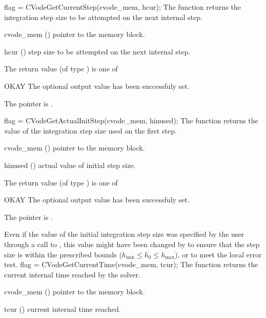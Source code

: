 {}
{
  flag = CVodeGetCurrentStep(cvode\_mem, hcur);
}
{
  The function  returns the
  integration step size to be attempted on the next internal step.
}
{
  \begin{args}
  \item[cvode\_mem] ()
    pointer to the {\cvodes} memory block.
  \item[hcur] ()
    step size to be attempted on the next internal step.
  \end{args}
}
{
  The return value  (of type ) is one of
  \begin{args}
  \item[OKAY] 
    The optional output value has been successfuly set.
  \item[\Id{CVG\_NO\_MEM}]
    The  pointer is .
  \end{args}
}
{}
{
  flag = CVodeGetActualInitStep(cvode\_mem, hinused);
}
{
  The function  returns the
  value of the integration step size used on the first step.
}
{
  \begin{args}
  \item[cvode\_mem] ()
    pointer to the {\cvodes} memory block.
  \item[hinused] ()
    actual value of initial step size.
  \end{args}
}
{
  The return value  (of type ) is one of
  \begin{args}
  \item[OKAY] 
    The optional output value has been successfuly set.
  \item[\Id{CVG\_NO\_MEM}]
    The  pointer is .
  \end{args}
}
{
  Even if the value of the initial integration step size was specified
  by the user through a call to , this value might have 
  been changed by {\cvodes} to ensure that the step size is within the 
  prescribed bounds ($h_{\min} \le h_0 \le h_{\max}$), or to meet the
  local error test.
}
{
  flag = CVodeGetCurrentTime(cvode\_mem, tcur);
}
{
  The function  returns the
  current internal time reached by the solver.
}
{
  \begin{args}
  \item[cvode\_mem] ()
    pointer to the {\cvodes} memory block.
  \item[tcur] ()
    current internal time reached.
  \end{args}
}

